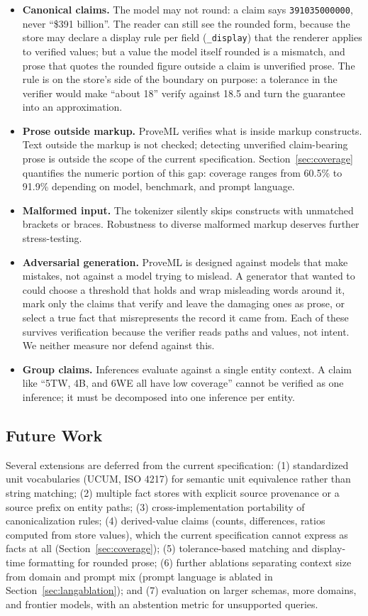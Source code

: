 \documentclass[11pt,a4paper]{article}
\begin{document}
\begin{itemize}[nosep]
    \item \textbf{Canonical claims.} The model may not round: a claim says \texttt{391035000000}, never ``\$391 billion''. The reader can still see the rounded form, because the store may declare a display rule per field (\texttt{\_display}) that the renderer applies to verified values; but a value the model itself rounded is a mismatch, and prose that quotes the rounded figure outside a claim is unverified prose. The rule is on the store's side of the boundary on purpose: a tolerance in the verifier would make ``about 18'' verify against 18.5 and turn the guarantee into an approximation.
    \item \textbf{Prose outside markup.} ProveML verifies what is inside markup constructs. Text outside the markup is not checked; detecting unverified claim-bearing prose is outside the scope of the current specification. Section~\ref{sec:coverage} quantifies the numeric portion of this gap: coverage ranges from 60.5\% to 91.9\% depending on model, benchmark, and prompt language.
    \item \textbf{Malformed input.} The tokenizer silently skips constructs with unmatched brackets or braces. Robustness to diverse malformed markup deserves further stress-testing.
    \item \textbf{Adversarial generation.} ProveML is designed against models that make mistakes, not against a model trying to mislead. A generator that wanted to could choose a threshold that holds and wrap misleading words around it, mark only the claims that verify and leave the damaging ones as prose, or select a true fact that misrepresents the record it came from. Each of these survives verification because the verifier reads paths and values, not intent. We neither measure nor defend against this.
    \item \textbf{Group claims.} Inferences evaluate against a single entity context. A claim like ``5TW, 4B, and 6WE all have low coverage'' cannot be verified as one inference; it must be decomposed into one inference per entity.
\end{itemize}

\subsection{Future Work}

Several extensions are deferred from the current specification: (1) standardized unit vocabularies (UCUM, ISO 4217) for semantic unit equivalence rather than string matching; (2) multiple fact stores with explicit source provenance or a source prefix on entity paths; (3) cross-implementation portability of canonicalization rules; (4) derived-value claims (counts, differences, ratios computed from store values), which the current specification cannot express as facts at all (Section~\ref{sec:coverage}); (5) tolerance-based matching and display-time formatting for rounded prose; (6) further ablations separating context size from domain and prompt mix (prompt language is ablated in Section~\ref{sec:langablation}); and (7) evaluation on larger schemas, more domains, and frontier models, with an abstention metric for unsupported queries.
\end{document}
